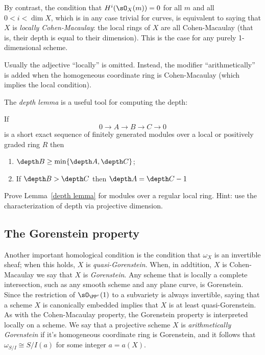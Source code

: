 By contrast, the condition
that $H^i(\sO_X(m)) = 0$ for all $m$ and all $0<i<\dim X$, which is in any case trivial for curves, is 
equivalent to saying that $X$ is \emph{locally Cohen-Macaulay}: the local rings of $X$ are all Cohen-Macaulay (that is, their depth is equal to their dimension). This is the case for any purely 1-dimensional scheme. 

Usually the adjective ``locally'' is omitted. Instead, the 
modifier ``arithmetically'' is added when the homogeneous coordinate ring is Cohen-Macaulay (which implies the local condition).

The \emph{depth lemma} \cite[***]{Eisenbud1995} is a useful tool for computing the depth:

\begin{lemma}\label{depth lemma}
If 
$$
0\to A\to B\to C\to 0
$$
is a short exact sequence of finitely generated modules over a local or positively graded ring $R$ then
\begin{enumerate}
\item $\depth B \geq \min\{\depth A, \depth C\}$;
 \item If $\depth B>\depth C$ then $\depth A = \depth C -1$
\end{enumerate}
\end{lemma}

\begin{exercise}
 Prove Lemma~\ref{depth lemma} for modules over a regular local ring.  Hint: use the characterization of depth
 via projective dimension.
\end{exercise}

\subsection{The Gorenstein property} 
Another important homological condition is the condition that $\omega_X$ is an invertible sheaf; when this holds, $X$ is \emph{quasi-Gorenstein}. When, in addtition, $X$ is Cohen-Macaulay we say that $X$ is \emph{Gorenstein}. Any scheme that is locally a complete intersection, such as any smooth scheme and any plane curve, is Gorenstein. Since the restriction
of $\sO_{\PP^r}(1)$ to a subvariety is always invertible, saying that a scheme $X$ is canonically embedded implies that
$X$ is at least quasi-Gorenstein. As with the Cohen-Macaulay property, the Gorenstein property is interpreted locally
on a scheme. We say that a projective scheme $X$ is \emph{arithmetically Gorenstein}
if it's homogeneous coordinate ring is Gorenstein, and it follows that $\omega_{S/I} \cong S/I(a)$ for some integer $a = a(X)$.

